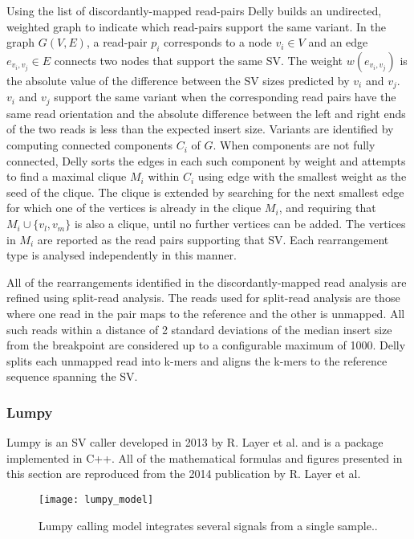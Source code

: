 Using the list of discordantly-mapped read-pairs Delly builds an undirected, weighted graph to indicate which read-pairs support the same variant. In the graph $G(V,E)$, a read-pair $p_i$ corresponds to a node $v_i \in V$ and an edge $e_{v_i,v_j} \in E$ connects two nodes that support the same SV. The weight $w(e_{v_i,v_j})$ is the absolute value of the difference between the SV sizes predicted by $v_i$ and $v_j$. $v_i$ and $v_j$ support the same variant when the corresponding read pairs have the same read orientation and the absolute difference between the left and right ends of the two reads is less than the expected insert size. Variants are identified by computing connected components $C_i$ of $G$. When components are not fully connected, Delly sorts the edges in each such component by weight and attempts to find a maximal clique $M_i$ within $C_i$ using edge with the smallest weight as the seed of the clique. The clique is extended by searching for the next smallest edge for which one of the vertices is already in the clique $M_i$, and requiring that $M_i \cup \{v_l,v_m\}$ is also a clique, until no further vertices can be added. The vertices in $M_i$ are reported as the read pairs supporting that SV. Each rearrangement type is analysed independently in this manner.

All of the rearrangements identified in the discordantly-mapped read analysis are refined using split-read analysis. The reads used for split-read analysis are those where one read in the pair maps to the reference and the other is unmapped. All such reads within a distance of 2 standard deviations of the median insert size from the breakpoint are considered up to a configurable maximum of 1000. Delly splits each unmapped read into k-mers and aligns the k-mers to the reference sequence spanning the SV.

\subsubsection{Lumpy}

Lumpy\autocite{layer2014lumpy} is an SV caller developed in 2013 by R. Layer et al. and is a package implemented in C++. All of the mathematical formulas and figures presented in this section are reproduced from the 2014 publication by R. Layer et al. 

\begin{figure}[H]
    \texttt{[image: lumpy\_model]}
    \centering
    \caption {Lumpy calling model integrates several signals from a single sample.\autocite{layer2014lumpy}.}
    \label{fig:lumpy_model}
\end{figure}

